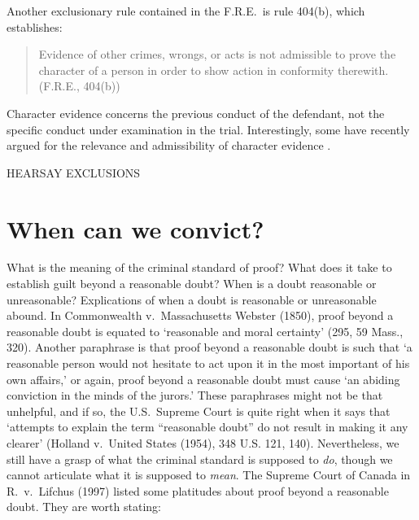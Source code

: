 \documentclass[10pt]{article}
\begin{document}
Another exclusionary rule contained in the F.R.E.\ is rule 404(b), which establishes:
%
\begin{quote}
\begin{singlespace}
Evidence of other crimes, wrongs, or acts is not admissible to prove 
the character of a person in order to show action in conformity therewith.
(F.R.E., 404(b))
\end{singlespace}
\end{quote}
%
Character evidence concerns the previous conduct of the defendant, not the specific conduct 
under examination in the trial. Interestingly, some have recently argued for the relevance 
and admissibility of character evidence \citep{redmayne02}.

HEARSAY EXCLUSIONS


\section{When can we convict?}




 What is the meaning of the criminal standard of proof? What does  it take to establish guilt beyond a reasonable doubt? 
  When is a doubt reasonable or unreasonable? Explications of when a doubt is reasonable 
or unreasonable abound. In Commonwealth v.\ Massachusetts Webster (1850), 
proof beyond a reasonable doubt is equated to `reasonable and moral certainty' (295, 59 Mass., 320).  Another paraphrase is that proof beyond a reasonable doubt is such that `a reasonable person would not hesitate to act upon it in the most important of his own affairs,' 
or again, proof beyond a reasonable doubt must cause `an abiding conviction in the minds of the jurors.' These paraphrases might not be that unhelpful, and if so, the U.S.\ Supreme Court is quite right when it says that `attempts to explain the term ``reasonable doubt'' do not result in making it any clearer' (Holland v.\ United States (1954), 348 U.S. 121, 140). Nevertheless, we still have a grasp of what the criminal standard 
is supposed to \textit{do}, though we cannot articulate what it is supposed to \textit{mean}. 
The Supreme Court of Canada in R.\ v.\ Lifchus (1997) listed some platitudes 
about proof beyond a reasonable doubt. They are worth stating:
\end{document}
